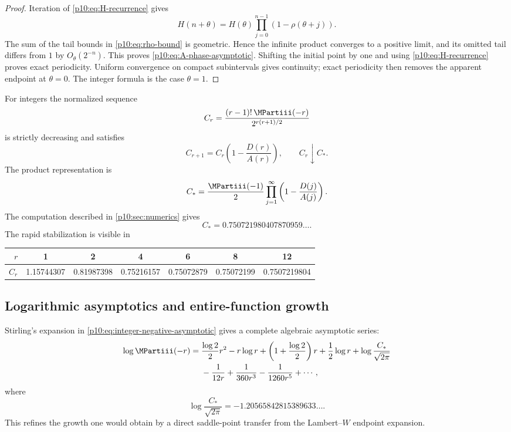 \documentclass[11pt,oneside]{article}
\theoremstyle{definition}
\theoremstyle{remark}
\newcommand{\1}{\mathbf 1}
\begin{document}
\begin{proof}
Iteration of \cref{p10:eq:H-recurrence} gives
\[
 H(n+\theta)=H(\theta)
 \prod_{j=0}^{n-1}(1-\rho(\theta+j)).
\]
The sum of the tail bounds in \cref{p10:eq:rho-bound} is geometric.  Hence the infinite
product converges to a positive limit, and its omitted tail differs from \(1\) by
\(O_\theta(2^{-n})\).  This proves \cref{p10:eq:A-phase-asymptotic}.  Shifting the
initial point by one and using \cref{p10:eq:H-recurrence} proves exact periodicity.
Uniform convergence on compact subintervals gives continuity; exact periodicity
then removes the apparent endpoint at \(\theta=0\).
The integer formula is the case \(\theta=1\).
\end{proof}

For integers the normalized sequence
\begin{equation}\label{p10:eq:Cr-def}
 C_r=\frac{(r-1)!\,\MPartiii(-r)}{2^{r(r+1)/2}}
\end{equation}
is strictly decreasing and satisfies
\begin{equation}\label{p10:eq:Cr-rec}
 C_{r+1}=C_r\left(1-\frac{D(r)}{A(r)}\right),
 \qquad C_r\downarrow C_*.
\end{equation}
The product representation is
\begin{equation}\label{p10:eq:Cstar-product}
 C_*=\frac{\MPartiii(-1)}2
 \prod_{j=1}^{\infty}
 \left(1-\frac{D(j)}{A(j)}\right).
\end{equation}
The computation described in \cref{p10:sec:numerics} gives
\begin{equation}\label{p10:eq:Cstar-numeric}
 C_*=0.750721980407870959\ldots.
\end{equation}
The rapid stabilization is visible in
\begin{center}
\small
\begin{tabular}{@{}rcccccc@{}}
\toprule
\(r\)&1&2&4&6&8&12\\
\midrule
\(C_r\)&1.15744307&0.81987398&0.75216157&0.75072879&
0.75072199&0.7507219804\\
\bottomrule
\end{tabular}
\end{center}

\subsection{Logarithmic asymptotics and entire-function growth}

Stirling's expansion in \cref{p10:eq:integer-negative-asymptotic} gives a complete
algebraic asymptotic series:
\begin{align}
 \log\MPartiii(-r)
 ={}&\frac{\log2}{2}r^2-r\log r
 +\left(1+\frac{\log2}{2}\right)r
 +\frac12\log r
 +\log\frac{C_*}{\sqrt{2\pi}}
 \nonumber\\
 &-\frac1{12r}+\frac1{360r^3}-\frac1{1260r^5}+\cdots,
 \label{p10:eq:log-negative-asymptotic}
\end{align}
where
\begin{equation}\label{p10:eq:log-Cstar-numeric}
 \log\frac{C_*}{\sqrt{2\pi}}
 =-1.20565842815389633\ldots.
\end{equation}
This refines the growth one would obtain by a direct saddle-point transfer from the
Lambert--\(W\) endpoint expansion.
\end{document}

